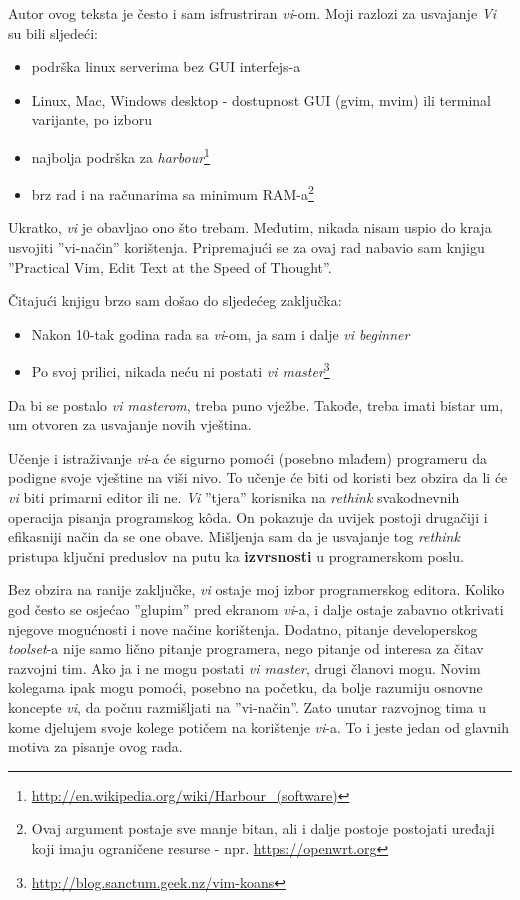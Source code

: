\documentclass[times, utf8, seminar]{fit}
\begin{document}
\label{sec:vimaster}

Autor ovog teksta je često i sam isfrustriran \emph{vi}-om. Moji razlozi za usvajanje \emph{Vi} su bili sljedeći:
\begin{itemize}
 \item podrška linux serverima bez GUI interfejs-a
 \item Linux, Mac, Windows desktop - dostupnost GUI (gvim, mvim) ili terminal varijante, po izboru 
 \item najbolja podrška za \emph{harbour}\footnote{\url{http://en.wikipedia.org/wiki/Harbour_(software)}}
 \item brz rad i na računarima sa minimum RAM-a\footnote{Ovaj argument postaje sve manje bitan, ali i dalje postoje postojati uređaji koji imaju ograničene resurse - npr. \url{https://openwrt.org}}
\end{itemize}

Ukratko, \emph{vi} je obavljao ono što trebam. Međutim, nikada nisam uspio do kraja usvojiti ''vi-način'' korištenja. Pripremajući se za ovaj rad nabavio sam knjigu ''Practical Vim, Edit Text at the Speed of Thought''\citep{pragvim}.

Čitajući knjigu brzo sam došao do sljedećeg zaključka:
\begin{itemize}
  \item Nakon 10-tak godina rada sa \emph{vi}-om, ja sam i dalje \emph{vi beginner} 
  \item Po svoj prilici, nikada neću ni postati \emph{vi master}\footnote{\url{http://blog.sanctum.geek.nz/vim-koans}}
\end{itemize}

Da bi se postalo \emph{vi masterom}, treba puno vježbe. Takođe, treba imati bistar um, um otvoren za usvajanje novih vještina. 

Učenje i istraživanje \emph{vi}-a će sigurno pomoći (posebno mlađem) programeru da podigne svoje vještine na viši nivo. To učenje će biti od koristi bez obzira da li će \emph{vi} biti primarni editor ili ne. \emph{Vi} ''tjera'' korisnika na \emph{rethink} svakodnevnih operacija pisanja programskog k\^oda. On pokazuje da uvijek postoji drugačiji i efikasniji način da se one obave. Mišljenja sam da je usvajanje tog \emph{rethink} pristupa ključni preduslov na putu ka \textbf{izvrsnosti} u programerskom poslu.

Bez obzira na ranije zaključke, \emph{vi} ostaje moj izbor programerskog editora.  Koliko god često se osjećao ''glupim'' pred ekranom \emph{vi}-a, i dalje ostaje zabavno otkrivati njegove mogućnosti i nove načine korištenja. Dodatno, pitanje developerskog \emph{toolset}-a nije samo lično pitanje programera, nego pitanje od interesa za čitav razvojni tim. 
Ako ja i ne mogu postati \emph{vi master}, drugi članovi mogu. Novim kolegama ipak mogu pomoći, posebno na početku, da bolje razumiju osnovne koncepte \emph{vi}, da počnu razmišljati na ''vi-način''. Zato unutar razvojnog tima u kome djelujem svoje kolege potičem na korištenje \emph{vi}-a. To i jeste jedan od glavnih motiva za pisanje ovog rada.
\end{document}
